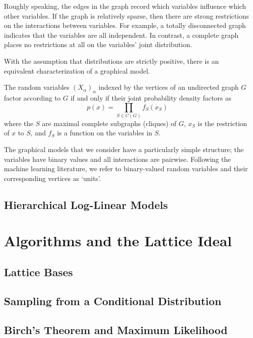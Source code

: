 \documentclass[cclicense]{hmcthesis}
\numberwithin{equation}{chapter}
\numberwithin{thmcounter}{chapter}
\begin{document}
    Roughly speaking, the edges in the graph record which variables influence
    which other variables.  If the graph is relatively sparse, then there are
    strong restrictions on the interactions between variables.  For example, a
    totally disconnected graph indicates that the variables are all independent.
    In contrast, a complete graph places no restrictions at all on the
    variables' joint distribution.
    
    With the assumption that distributions are strictly positive, there is an
    equivalent characterization of a graphical model.

    \begin{theorem}
        The random variables $(X_\alpha)_\alpha$ indexed by the vertices of an
        undirected graph $G$ factor according to $G$ if and only if their
        joint probability density factors as
        \[
            p(x) = \prod_{S \in C(G)} f_S(x_S)
        \]
        where the $S$ are maximal complete subgraphs (cliques) of $G$, $x_S$ is
        the restriction of $x$ to $S$, and $f_S$ is a function on the variables in
        $S$.
    \end{theorem}

    The graphical models that we consider have a particularly simple structure;
    the variables have binary values and all interactions are pairwise.
    Following the machine learning literature, we refer to binary-valued random
    variables and their corresponding vertices as `units'.

\section{Hierarchical Log-Linear Models}

\chapter{Algorithms and the Lattice Ideal}

\section{Lattice Bases}

\section{Sampling from a Conditional Distribution}

\section{Birch's Theorem and Maximum Likelihood}
\end{document}
